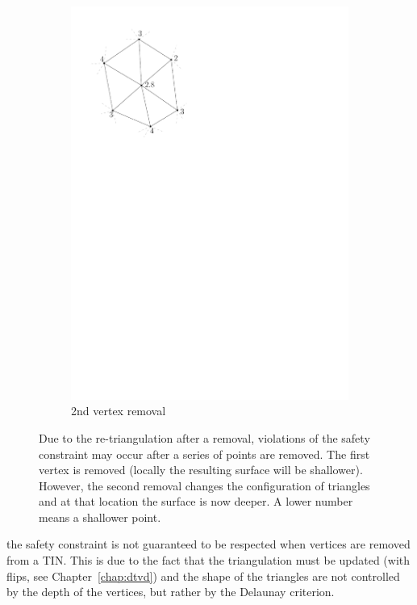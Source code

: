 \begin{figure}
\begin{subfigure}[b]{0.22\linewidth}
    \includegraphics[width=\textwidth,page=3]{figs/simpfail.pdf}
    \caption{2nd vertex removal}\label{fig:simpfail:c}
  \end{subfigure}
\caption{Due to the re-triangulation after a removal, violations of the safety constraint may occur after a series of points are removed. The first vertex is removed (locally the resulting surface will be shallower). However, the second removal changes the configuration of triangles and at that location the surface is now deeper. A lower number means a shallower point.}
\label{fig:simpfail}
\end{figure}
the safety constraint is not guaranteed to be respected when vertices are removed from a TIN.
This is due to the fact that the triangulation must be updated (with flips, see Chapter~\ref{chap:dtvd}) and the shape of the triangles are not controlled by the depth of the vertices, but rather by the Delaunay criterion.


